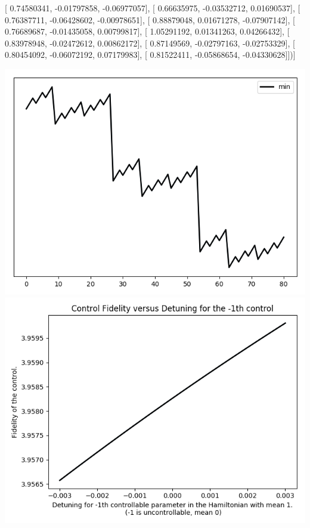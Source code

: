 \documentclass{article}
\begin{document}
       [ 0.74580341, -0.01797858, -0.06977057],
       [ 0.66635975, -0.03532712,  0.01690537],
       [ 0.76387711, -0.06428602, -0.00978651],
       [ 0.88879048,  0.01671278, -0.07907142],
       [ 0.76689687, -0.01435058,  0.00799817],
       [ 1.05291192,  0.01341263,  0.04266432],
       [ 0.83978948, -0.02472612,  0.00862172],
       [ 0.87149569, -0.02797163, -0.02753329],
       [ 0.80454092, -0.06072192,  0.07179983],
       [ 0.81522411, -0.05868654, -0.04330628]])]
\begin{center}
\includegraphics[scale=.9]{report_pickled_controls32/control_dpn_all}
\includegraphics[scale=.9]{control_fid_0}

\end{center}
\end{document}
